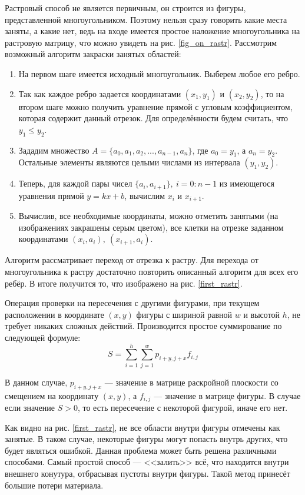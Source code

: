 \documentclass[14pt]{extarticle}
\begin{document}
	Растровый способ не является первичным, он строится из фигуры, представленной многоугольником.
	Поэтому нельзя сразу говорить какие места заняты, а какие нет, ведь на входе имеется простое наложение многоугольника на растровую матрицу, что можно увидеть на рис. \ref{fig_on_rastr}.
	Рассмотрим возможный алгоритм закраски занятых областей:
	\begin{enumerate}
		\item На первом шаге имеется исходный многоугольник. Выберем любое его ребро.
		\item Так как каждое ребро задается координатами $(x_1 , y_1 )$ и $(x_2 , y_2 )$, то на втором шаге можно получить уравнение прямой с угловым коэффициентом, которая содержит данный
		отрезок. Для определённости будем считать, что $y_1 \leq y_2$.
		\item Зададим множество $A=\{a_0, a_1, a_2, ..., a_{n-1}, a_n\}$, где $a_0=y_1$, а $a_n = y_2$. Остальные элементы являются целыми числами из интервала $(y_1, y_2)$.  
		\item Теперь, для каждой пары чисел $\{a_i, a_{i+1}\},\ i = 0:n-1$ из имеющегося уравнения прямой $y=kx+b$, вычислим $x_i$ и $x_{i+1}$.
		\item Вычислив, все необходимые координаты, можно отметить занятыми (на изображениях закрашены серым цветом), все клетки на отрезке заданном координатами $(x_i, a_i),\ (x_{i+1}, a_i)$.
	\end{enumerate}


	Алгоритм рассматривает переход от отрезка к растру. Для перехода от многоугольника к растру достаточно повторить описанный алгоритм для всех его ребёр. В итоге получится то, что изображено на рис. \ref{first_rastr}.
	


	Операция проверки на пересечения с другими фигурами, при текущем расположении в координате $(x, y)$ фигуры с шириной равной $w$ и высотой $h$, не требует никаких сложных действий. Производится простое суммирование по следующей формуле:
	\begin{equation}
		\label{simple_sum}
		S = \sum_{i=1}^{h}\sum_{j=1}^{w}p_{i+y, j+x}f_{i,j} 
	\end{equation}


	В данном случае, $p_{i+y,j+x}$ --- значение в матрице раскройной плоскости со смещением на координату $(x, y)$, а $f_{i,j}$ --- значение в матрице фигуры. В случае если значение $S > 0$, то есть пересечение с некоторой фигурой, иначе его нет.


	Как видно на рис. \ref{first_rastr}, не все области внутри фигуры отмечены как занятые. В таком случае, некоторые фигуры могут попасть внутрь других, что будет являться ошибкой. Данная
	проблема может быть решена различными способами. Самый простой способ --- <<залить>> всё, что находится внутри внешнего конутура, отбрасывая пустоты внутри фигуры. Такой метод принесёт большие потери материала.
\end{document}
